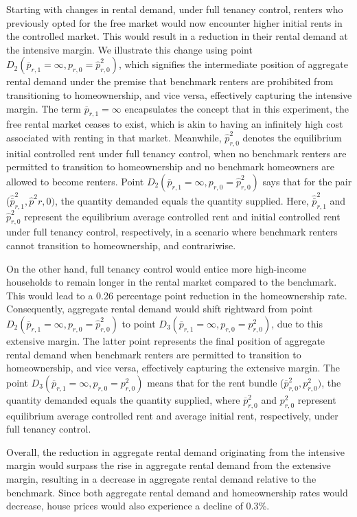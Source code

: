 \documentclass[parskip=full]{article}
\begin{document}
Starting with changes in rental demand, under full tenancy control, renters who previously opted for the free market would now encounter higher initial rents in the controlled market. This would result in a reduction in their rental demand at the intensive margin. We illustrate this change using point $D_{2}(\overline{p}_{r,1}=\infty,p_{r,0}=\hat{p}^{2}_{r,0})$, which signifies the intermediate position of aggregate rental demand under the premise that benchmark renters are prohibited from transitioning to homeownership, and vice versa, effectively capturing the intensive margin. The term $\overline{p}_{r,1}=\infty$ encapsulates the concept that in this experiment, the free rental market ceases to exist, which is akin to having an infinitely high cost associated with renting in that market. Meanwhile, $\hat{p}^{2}_{r,0}$ denotes the equilibrium initial controlled rent under full tenancy control, when no benchmark renters are permitted to transition to homeownership and no benchmark homeowners are allowed to become renters. Point $D_{2}(\overline{p}_{r,1}=\infty,p_{r,0}=\hat{p}^{2}_{r,0})$ says that for the pair ($\hat{\bar{p}}^{2}_{r,1},\hat{p}^{2}{r,0})$, the quantity demanded equals the quantity supplied. Here, $\hat{\bar{p}}^{2}_{r,1}$ and $\hat{p}^{2}_{r,0}$ represent the equilibrium average controlled rent and initial controlled rent under full tenancy control, respectively, in a scenario where benchmark renters cannot transition to homeownership, and contrariwise.

On the other hand, full tenancy control would entice more high-income households to remain longer in the rental market compared to the benchmark. This would lead to a 0.26 percentage point reduction in the homeownership rate. Consequently, aggregate rental demand would shift rightward from point $D_{2}(\overline{p}_{r,1}=\infty,p_{r,0}=\hat{p}^{2}_{r,0})$ to point $D_{3}(\overline{p}_{r,1}=\infty,p_{r,0}=p^{2}_{r,0})$, due to this extensive margin. The latter point represents the final position of aggregate rental demand when benchmark renters are permitted to transition to homeownership, and vice versa, effectively capturing the extensive margin. The point $D_{3}(\overline{p}_{r,1}=\infty,p_{r,0}=p^{2}_{r,0})$ means that for the rent bundle ($\overline{p}^{2}_{r,0},p^{2}_{r,0})$, the quantity demanded equals the quantity supplied, where $\overline{p}^{2}_{r,0}$ and $p^{2}_{r,0}$ represent equilibrium average controlled rent and average initial rent, respectively, under full tenancy control.

Overall, the reduction in aggregate rental demand originating from the intensive margin would surpass the rise in aggregate rental demand from the extensive margin, resulting in a decrease in aggregate rental demand relative to the benchmark. Since both aggregate rental demand and homeownership rates would decrease, house prices would also experience a decline of 0.3\%.
\end{document}

